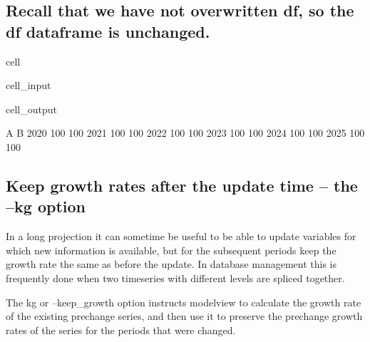 \documentclass[letterpaper,10pt,english]{jupyterBook}
\begin{document}
\subsection{Recall  that we have not overwritten df, so the df dataframe is unchanged.}
\label{\detokenize{content/04_PythonEssentials/UpdateCommand:recall-that-we-have-not-overwritten-df-so-the-df-dataframe-is-unchanged}}
\begin{sphinxuseclass}{cell}\begin{sphinxVerbatimInput}

\begin{sphinxuseclass}{cell_input}
\begin{sphinxVerbatim}[commandchars=\\\{\}]
\end{sphinxVerbatim}

\end{sphinxuseclass}\end{sphinxVerbatimInput}
\begin{sphinxVerbatimOutput}

\begin{sphinxuseclass}{cell_output}
\begin{sphinxVerbatim}[commandchars=\\\{\}]
        A    B
2020  100  100
2021  100  100
2022  100  100
2023  100  100
2024  100  100
2025  100  100
\end{sphinxVerbatim}

\end{sphinxuseclass}\end{sphinxVerbatimOutput}

\end{sphinxuseclass}

\subsection{Keep growth rates after the update time – the –kg option}
\label{\detokenize{content/04_PythonEssentials/UpdateCommand:keep-growth-rates-after-the-update-time-the-kg-option}}
\sphinxAtStartPar
In a long projection it can sometime be useful to be able to update variables for which new information is available, but for the subsequent periods keep the growth rate the same as before the update. In database management this is frequently done when two time\sphinxhyphen{}series with different levels are spliced together.

\sphinxAtStartPar
The \sphinxhyphen{}kg or –keep\_growth option instructs modelview to calculate the growth rate of the existing pre\sphinxhyphen{}change series, and then use it to preserve the pre\sphinxhyphen{}change growth rates of the series for the periods that were  changed.
\end{document}
